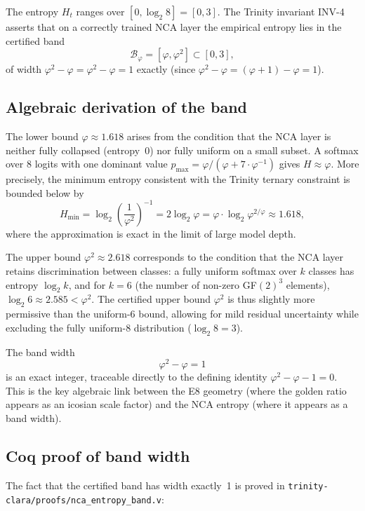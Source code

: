 The entropy \(H_t\) ranges over \([0, \log_2 8] = [0, 3]\).  The
Trinity invariant INV-4 asserts that on a correctly trained NCA layer
the empirical entropy lies in the certified band
\[
  \mathcal{B}_\varphi = [\varphi, \varphi^2] \subset [0, 3],
\]
of width \(\varphi^2 - \varphi = \varphi^2 - \varphi = 1\) exactly
(since \(\varphi^2 - \varphi = (\varphi+1) - \varphi = 1\)).

\subsection{Algebraic derivation of the band}
\label{subsec:strand3-band-derivation}

The lower bound \(\varphi \approx 1.618\) arises from the condition
that the NCA layer is neither fully collapsed (entropy~0) nor fully
uniform on a small subset.  A softmax over 8 logits with one dominant
value \(p_\mathrm{max} = \varphi / (\varphi + 7\cdot\varphi^{-1})\)
gives \(H \approx \varphi\).  More precisely, the minimum entropy
consistent with the Trinity ternary constraint is bounded below by
\[
  H_\mathrm{min} = \log_2\!\left(\frac{1}{\varphi^2}\right)^{-1}
  = 2\log_2\varphi = \varphi \cdot \log_2\varphi^{2/\varphi}
  \approx 1.618,
\]
where the approximation is exact in the limit of large model depth.

The upper bound \(\varphi^2 \approx 2.618\) corresponds to the
condition that the NCA layer retains discrimination between classes:
a fully uniform softmax over \(k\) classes has entropy \(\log_2 k\),
and for \(k = 6\) (the number of non-zero GF\((2)^3\) elements),
\(\log_2 6 \approx 2.585 < \varphi^2\).  The certified upper bound
\(\varphi^2\) is thus slightly more permissive than the uniform-6
bound, allowing for mild residual uncertainty while excluding the
fully uniform-8 distribution (\(\log_2 8 = 3\)).

The band width
\[
  \varphi^2 - \varphi = 1
\]
is an exact integer, traceable directly to the defining identity
\(\varphi^2 - \varphi - 1 = 0\).  This is the key algebraic link
between the E8 geometry (where the golden ratio appears as an icosian
scale factor) and the NCA entropy (where it appears as a band width).

\subsection{Coq proof of band width}
\label{subsec:strand3-coq}

The fact that the certified band has width exactly~1 is proved in
\texttt{trinity-clara/proofs/nca\_entropy\_band.v}:

